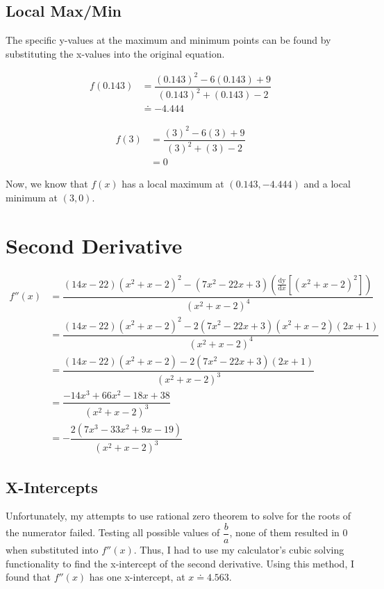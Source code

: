 \documentclass[12pt]{article}
\begin{document}
\subsection*{Local Max/Min}

The specific y-values at the maximum and minimum points can be found by substituting the x-values into the original equation. 

\begin{align*}
f(0.143) &= \dfrac{(0.143)^2-6(0.143)+9}{(0.143)^2+(0.143)-2}
\\&\doteq -4.444 
\end{align*}

\begin{align*}
f(3) &= \dfrac{(3)^2-6(3)+9}{(3)^2+(3)-2}
\\&= 0
\end{align*}

Now, we know that $f(x)$ has a local maximum at $(0.143, -4.444)$ and a local minimum at $(3, 0)$.

\section*{Second Derivative}

\begin{align*}
f''(x) &= \dfrac{(14x-22)(x^2+x-2)^2-(7x^2-22x+3)(\frac{\mathrm{dy} }{\mathrm{d} x}[(x^2+x-2)^2])}{(x^2+x-2)^4}
\\&= \dfrac{(14x-22)(x^2+x-2)^2-2(7x^2-22x+3)(x^2+x-2)(2x+1)}{(x^2+x-2)^4}
\\&= \dfrac{(14x-22)(x^2+x-2)-2(7x^2-22x+3)(2x+1)}{(x^2+x-2)^3}
\\&= \dfrac{-14x^3+66x^2-18x+38}{(x^2+x-2)^3}
\\&= -\dfrac{2(7x^3-33x^2+9x-19)}{(x^2+x-2)^3}
\end{align*}

\subsection*{X-Intercepts}

Unfortunately, my attempts to use rational zero theorem to solve for the roots of the numerator failed. Testing all possible values of $\dfrac{b}{a}$, none of them resulted in 0 when substituted into $f''(x)$. Thus, I had to use my calculator's cubic solving functionality to find the x-intercept of the second derivative. Using this method, I found that $f''(x)$ has one x-intercept, at $x \doteq 4.563$.
\end{document}
